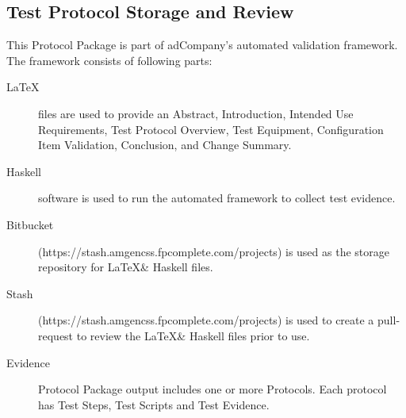 \subsection{Test Protocol Storage and Review}
This Protocol Package is part of adCompany's automated validation framework.  The
framework consists of following parts:
\begin{description}
  \item[\LaTeX] files are used to provide an Abstract, Introduction, Intended
    Use Requirements, Test Protocol Overview, Test Equipment, Configuration
    Item Validation, Conclusion, and Change Summary.

  \item[Haskell] software is used to run the automated framework to collect test
    evidence.

  \item[Bitbucket] (https://stash.amgencss.fpcomplete.com/projects) is used as
    the storage repository for \LaTeX \& Haskell files.

  \item[Stash] (https://stash.amgencss.fpcomplete.com/projects) is used to
    create a pull-request to review the \LaTeX \& Haskell files prior to use.

  \item[Evidence] Protocol Package output includes one or more Protocols.  Each
    protocol has Test Steps, Test Scripts and Test Evidence.
\end{description}
